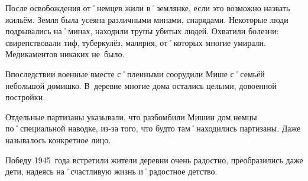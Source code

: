 После освобождения от˚немцев жили в˚землянке, если это возможно назвать жильём. Земля была усеяна различными минами, снарядами. Некоторые люди подрывались на˚минах, находили трупы убитых людей. Охватили болезни: свирепствовали тиф, туберкулёз, малярия, от˚которых многие умирали. Медикаментов никаких не~было. 

Впоследствии военные вместе с˚пленными соорудили Мише с˚семьёй небольшой домишко. В~деревне многие дома остались целыми, довоенной постройки. 

Отдельные партизаны указывали, что разбомбили Мишин дом немцы по˚специальной наводке, из-за того, что будто там˚находились партизаны. Даже называлось конкретное лицо. 

Победу 1945~года встретили жители деревни очень радостно, преобразились даже дети, надеясь на˚счастливую жизнь и˚радостное детство.